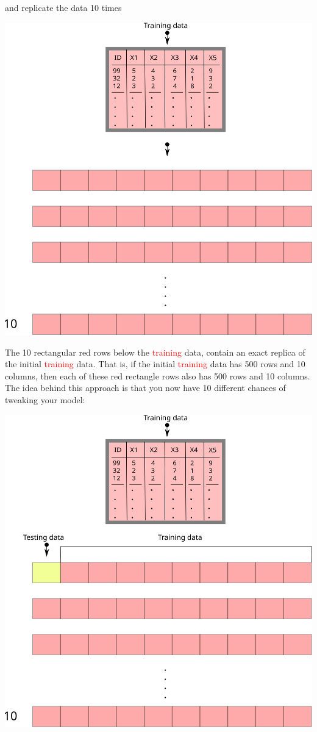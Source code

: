 \documentclass[
]{book}
\begin{document}
and replicate the data 10 times

\begin{center}\includegraphics[width=0.95\linewidth]{./img/train_cv2_smaller} \end{center}

The 10 rectangular red rows below the \textcolor{red}{training} data, contain an exact replica of the initial \textcolor{red}{training} data. That is, if the initial \textcolor{red}{training} data has 500 rows and 10 columns, then each of these red rectangle rows also has 500 rows and 10 columns. The idea behind this approach is that you now have 10 different chances of tweaking your model:

\begin{center}\includegraphics[width=0.95\linewidth]{./img/train_cv3_smaller} \end{center}
\end{document}
